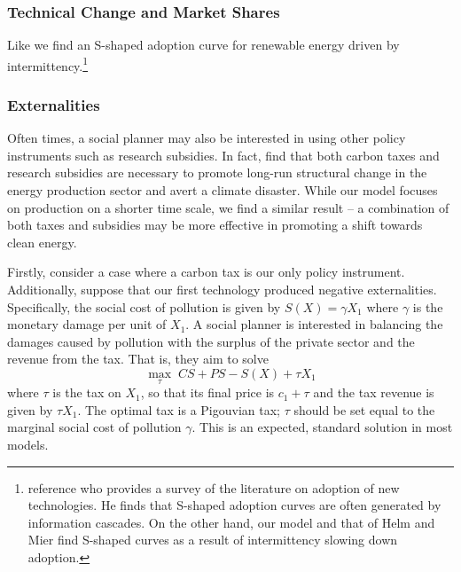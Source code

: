 \documentclass[11pt,a4paper]{extarticle}
\begin{document}
\subsubsection{Technical Change and Market Shares}

Like \cite{HH} we find an S-shaped adoption curve for renewable energy driven by intermittency.\footnote{\citet{HH} reference \citet{Geroski2000} who provides a survey of the literature on adoption of new technologies. He finds that S-shaped adoption curves are often generated by information cascades. On the other hand, our model and that of Helm and Mier find S-shaped curves as a result of intermittency slowing down adoption.} 

\subsubsection{Externalities}


Often times, a social planner may also be interested in using other policy instruments such as research subsidies. In fact, \citet{Ace2012} find that both carbon taxes and research subsidies are necessary to promote long-run structural change in the energy production sector and avert a climate disaster. While our model focuses on production on a shorter time scale, we find a similar result -- a combination of both taxes and subsidies may be more effective in promoting a shift towards clean energy. 


Firstly, consider a case where a carbon tax is our only policy instrument. Additionally, suppose that our first technology produced negative externalities. Specifically, the social cost of pollution is given by $S(X) = \gamma X_1$ where $\gamma$ is the monetary damage per unit of $X_1$. A social planner is interested in balancing the damages caused by pollution with the surplus of the private sector and the revenue from the tax. That is, they aim to solve
$$\max_{\tau} \; CS + PS - S(X) + \tau X_1$$
where $\tau$ is the tax on $X_1$, so that its final price is $c_1 + \tau$ and the tax revenue is given by $\tau X_1$. The optimal tax is a Pigouvian tax; $\tau$ should be set equal to the marginal social cost of pollution $\gamma$. This is an expected, standard solution in most models.
\end{document}
